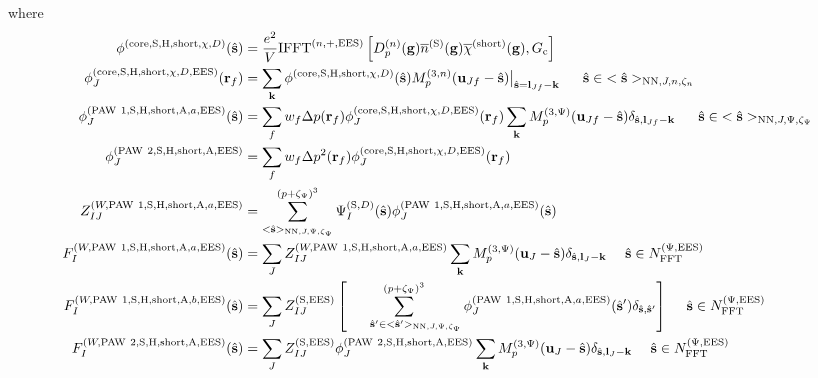 \documentclass[paper=a4, fontsize=11pt]{article} %
\numberwithin{equation}{section} %
\numberwithin{figure}{section} %
\numberwithin{table}{section} %
\newcommand{\ol}{\overline}
\newcommand{\bu}{{\bf{u}}}
\newcommand{\bl}{{\bf{l}}}
\newcommand{\bk}{{\bf{k}}}
\newcommand{\bs}{{\bf{s}}}
\newcommand{\bg}{{\bf{g}}}
\newcommand{\br}{{\bf{r}}}
\newcommand{\hs}{{\hat{\bf{s}}}}
\newcommand{\rS}{{\mathrm{S}}}
\newcommand{\rEES}{{\mathrm{EES}}}
\newcommand{\rcore}{{\mathrm{core}}}
\newcommand{\rNN}{{\mathrm{NN}}}
\newcommand{\rshort}{{\mathrm{short}}}
\newcommand{\rP}{{\mathrm{PAW}}}
\newcommand{\rH}{{\mathrm{H}}}
\newcommand{\rA}{{\mathrm{A}}}
\newcommand{\NFFTpEES}{{N^{\mathrm{(\Psi,\rEES})}_{\mathrm{FFT}}}}
\newcommand{\Gc}{{G_{\mathrm{c}}}}
\newcommand{\Dng}{{D^{(n)}_p(\bg)}}
\newcommand{\Mn}{{M_p^{(3,n)}}}
\newcommand{\Mp}{{M_p^{(3,\Psi)}}}
\newcommand{\IFFTnEES}{{\mathrm{IFFT}^{(n,+,\rEES)}}}
\newcommand{\pzp}{{(p+\zeta_{\Psi})^3}}
\newcommand{\hsJp}{{<\hs>_{\rNN,J,\Psi,\zeta_\Psi}}}
\newcommand{\hsJn}{{<\hs>_{\rNN,J,n,\zeta_n}}}
\newcommand{\hsinJp}{{\ \ \ \ \ \hs  \in  \hsJp}}
\newcommand{\hsinJn}{{\ \ \ \ \ \hs  \in  \hsJn}}
\newcommand{\hspJp}{{<\hs'>_{\rNN,J,\Psi,\zeta_\Psi}}}
\newcommand{\hspinJp}{{\ \ \ \ \ \hs'  \in  \hspJp}}
\newcommand{\hsinpEES}{{\ \ \ \ \hs \in \NFFTpEES}}
\begin{document}
where
\begin{equation}
\begin{split}
\phi^{(\rcore,\rS,\rH,\rshort,\chi,D)}(\hs)&=\frac{e^2}{V} \IFFTnEES\left[\Dng \ol n^{(\rS)}(\bg)\ol \chi^{(\rshort)}(\bg),\Gc\right]\\
\phi_J^{(\rcore,\rS,\rH,\rshort,\chi,D,\rEES)}(\br_f) &=\sum_{\bk} \phi^{(\rcore,\rS,\rH,\rshort,\chi,D)}(\hs)\Mn(\bu_{Jf}-\hat \bs)\big|_{\hs=\bl_{Jf}-\bk} \hsinJn\\
\phi_J^{(\rP\ 1,\rS,\rH,\rshort,\rA,a,\rEES)}(\hs) &= \sum_f w_f \Delta p(\br_f) \phi_J^{(\rcore,\rS,\rH,\rshort,\chi,D,\rEES)}(\br_f) \sum_{\bk} \Mp(\bu_{Jf}-\hat \bs)\delta_{\hat \bs,\bl_{Jf}-\bk} \hsinJp\\
\phi_J^{(\rP\ 2,\rS,\rH,\rshort,\rA,\rEES)} &= \sum_f w_f \Delta p^2(\br_f) \phi_J^{(\rcore,\rS,\rH,\rshort,\chi,D,\rEES)}(\br_f) \\
Z_{IJ}^{(W,\rP\ 1,\rS,\rH,\rshort,\rA,a,\rEES)} &= \sum_{\hsJp}^{\pzp} \Psi_{I}^{(\rS,D)}(\hat \bs) \phi_J^{(\rP\ 1,\rS,\rH,\rshort,\rA,a,\rEES)}(\hs) \\
F_I^{(W,\rP\ 1,\rS,\rH,\rshort,\rA,a,\rEES)}(\hs) &= \sum_J Z_{IJ}^{(W,\rP\ 1,\rS,\rH,\rshort,\rA,a,\rEES)}\sum_{\bk} \Mp(\bu_{J}-\hat \bs) \delta_{\hat \bs,\bl_J-\bk} \hsinpEES \\
F_I^{(W,\rP\ 1,\rS,\rH,\rshort,\rA,b,\rEES)}(\hs) &=\sum_J Z_{IJ}^{(\rS,\rEES)}  \left[ \sum_{\hspinJp}^\pzp \phi_J^{(\rP\ 1,\rS,\rH,\rshort,\rA,a,\rEES)}(\hs') \delta_{\hs,\hs'} \right] \hsinpEES\\
F_I^{(W,\rP\ 2,\rS,\rH,\rshort,\rA,\rEES)}(\hs)  &= \sum_J  Z_{IJ}^{(\rS,\rEES)} \phi_J^{(\rP\ 2,\rS,\rH,\rshort,\rA,\rEES)} \sum_{\bk}  \Mp(\bu_{J}-\hat \bs)\delta_{\hat \bs,\bl_J-\bk} \hsinpEES \\
\end{split}
\end{equation}
\end{document}
